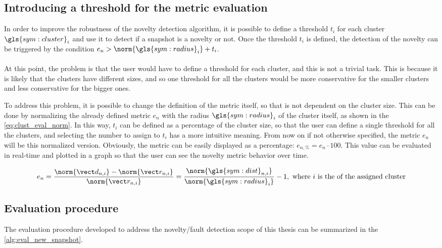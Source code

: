 \subsection{Introducing a threshold for the metric evaluation}
In order to improve the robustness of the novelty detection algorithm, it is possible to define a threshold ${t}_i$ for each cluster $\gls{sym:cluster}_i$ and use it to detect if a snapshot is a novelty or not. Once the threshold ${t}_i$ is defined, the detection of the novelty can be triggered by the condition $e_{n} > \norm{\gls{sym:radius}_i}+ {t}_i$.

\paragraph*{}
At this point, the problem is that the user would have to define a threshold for each cluster, and this is not a trivial task. This is because it is likely that the clusters have different sizes, and so one threshold for all the clusters would be more conservative for the smaller clusters and less conservative for the bigger ones.

To address this problem, it is possible to change the definition of the metric itself, so that is not dependent on the cluster size. This can be done by normalizing the already defined metric $e_{n}$ with the radius $\gls{sym:radius}_i$ of the cluster itself, as shown in the \autoref{eq:clust_eval_norm}. In this way, $t_i$ can be defined as a percentage of the cluster size, so that the user can define a single threshold for all the clusters, and selecting the number to assign to $t_i$ has a more intuitive meaning. From now on if not otherwise specified, the metric $e_{n}$ will be this normalized version.
Obviously, the metric can be easily displayed as a percentage: $e_{n,\%} = e_n \cdot 100$.
This value can be evaluated in real-time and plotted in a graph so that the user can see the novelty metric behavior over time.

\begin{equation}
  \label{eq:clust_eval_norm}
  e_{n} = \frac{\norm{\vect d_{n,i}}-\norm{\vect r_{n,i}}}{\norm{\vect r_{n,i}}} = \frac{\norm{\gls{sym:dist}_{n,i}}}{\norm{\gls{sym:radius}_{i}}} - 1, \text{ where $i$ is the of the assigned cluster}
\end{equation}

\subsection{Evaluation procedure}
The evaluation procedure developed to address the novelty/fault detection scope of this thesis can be summarized in the \autoref{alg:eval_new_snapshot}.

